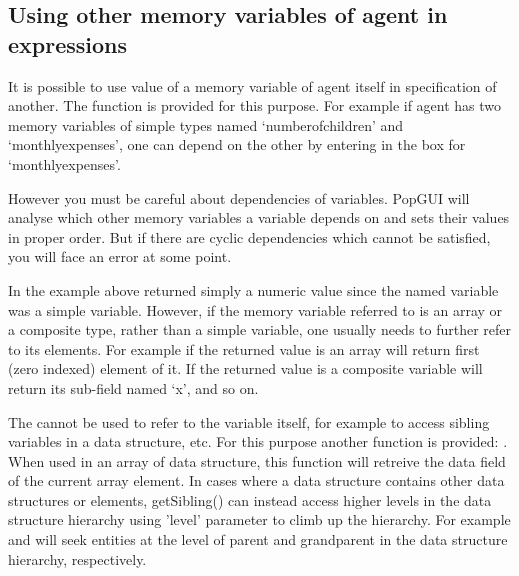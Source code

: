 \subsection{Using other memory variables of agent in expressions}
It is possible to use value of a memory variable of agent itself in specification of another. The  function is provided for this purpose. For example if agent has two memory variables of simple types named `numberofchildren' and `monthlyexpenses', one can depend on the other by entering  in the box for `monthlyexpenses'. 

However you must be careful about dependencies of variables. PopGUI will analyse which other memory variables a variable depends on and sets their values in proper order. But if there are cyclic dependencies which cannot be satisfied, you will face an error at some point.

In the example above  returned simply a numeric value since the named variable was a simple variable. However, if the memory variable referred to is an array or a composite type, rather than a simple variable, one usually needs to further refer to its elements. For example if the returned value is an array  will return first (zero indexed) element of it. If the returned value is a composite variable  will return its sub-field named `x', and so on.

The  cannot be used to refer to the variable itself, for example to access sibling variables in a data structure, etc. For this purpose another function is provided: . When used in an array of data structure, this function will retreive the data field of the current array element. In cases where a data structure contains other data structures or elements, getSibling() can instead access higher levels in the data structure hierarchy using 'level' parameter to climb up the hierarchy. For example  and  will seek entities at the level of parent and grandparent in the data structure hierarchy, respectively.

